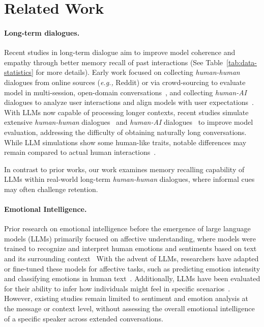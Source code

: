 \section{Related Work}
\paragraph{Long-term dialogues.}
Recent studies in long-term dialogue aim to improve model coherence and empathy through better memory recall of past interactions (See Table~\ref{tab:data-statistics} for more details).
Early work focused on collecting \textit{human-human} dialogues from online sources (\textit{e.g.,} Reddit) or via crowd-sourcing to evaluate model in multi-session, open-domain conversations~\cite{xu2022beyond, feng2022mmdialog, ahn2023mpchat, li2017dailydialog}, and collecting \textit{human-AI} dialogues to analyze user interactions and align models with user expectations~\cite{zheng2023lmsys, kopf2024openassistant, zhao2024wildchat}.
With LLMs now capable of processing longer contexts, recent studies simulate extensive \textit{human-human} dialogues~\cite{kim-etal-2023-soda, jang2023conversation, maharana-etal-2024-evaluating} and \textit{human-AI} dialogues~\cite{zhong2024memorybank, du2024perltqa, wu2024longmemeval} to improve model evaluation, addressing the difficulty of obtaining naturally long conversations.
While LLM simulations show some human-like traits, notable differences may remain compared to actual human interactions~\cite{hu-etal-2023-fine, kim-etal-2023-fantom, zhou2024real, mahowald2024dissociating, ivey2024real}.

In contrast to prior works, our work examines memory recalling capability of LLMs within real-world long-term \textit{human-human} dialogues, where informal cues may often challenge retention.

\paragraph{Emotional Intelligence.}
Prior research on emotional intelligence before the emergence of large language models (LLMs) primarily focused on affective understanding, where models were trained to recognize and interpret human emotions and sentiments based on text and its surrounding context~\cite{hu2004mining, pang-lee-2004-sentimental, hutto2014vader, rosenthal-etal-2017-semeval, mohammad-etal-2018-semeval, yin-etal-2020-sentibert, antypas2023supertweeteval}
With the advent of LLMs, researchers have adapted or fine-tuned these models for affective tasks, such as predicting emotion intensity and classifying emotions in human text~\cite{lei2023instructerc, liu2024emollms, zhang2023dialoguellm}.
Additionally, LLMs have been evaluated for their ability to infer how individuals might feel in specific scenarios~\cite{wang2023emotional, paech2023eq, huang2023emotionally, zhao2024both}.
However, existing studies remain limited to sentiment and emotion analysis at the message or context level, without assessing the overall emotional intelligence of a specific speaker across extended conversations.

